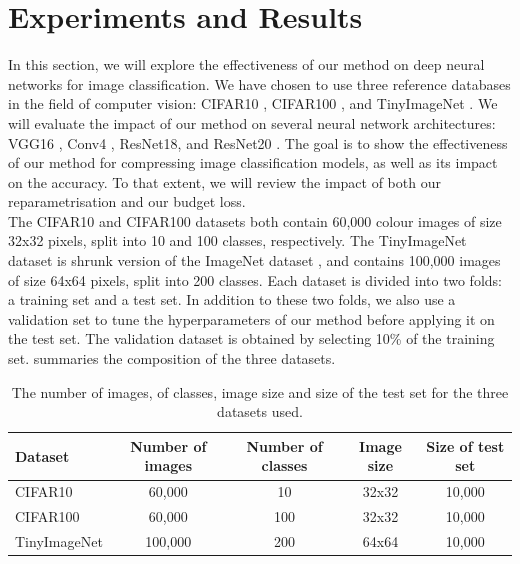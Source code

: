 
\section{Experiments and Results}
\label{sec:chap1:experiments}
In this section, we will explore the effectiveness of our method on deep neural
networks for image classification. We have chosen to use three reference
databases in the field of computer vision: CIFAR10 \cite{CIFARdataset}, CIFAR100
\cite{CIFARdataset}, and TinyImageNet \cite{TinyImageNet}. We will evaluate the
impact of our method on several neural network architectures: VGG16
\cite{DBLP:journals/corr/SimonyanZ14a}, Conv4 \cite{DBLP:conf/iclr/FrankleC19},
ResNet18, and ResNet20 \cite{DBLP:conf/cvpr/HeZRS16}. The goal is to show the
effectiveness of our method for compressing image classification models, as well
as its impact on the accuracy. To that extent, we will review the impact of both
our reparametrisation and our budget loss.\\

The CIFAR10 and CIFAR100 datasets both contain 60,000 colour images of size
32x32 pixels, split into 10 and 100 classes, respectively. The TinyImageNet
dataset is shrunk version of the ImageNet dataset
\cite{DBLP:journals/ijcv/RussakovskyDSKS15}, and contains 100,000 images of size
64x64 pixels, split into 200 classes. Each dataset is divided into two folds: a
training set and a test set. In addition to these two folds, we also use a
validation set to tune the hyperparameters of our method before applying it on
the test set. The validation dataset is obtained by selecting 10\% of the
training set.  summaries the composition of the three
datasets.\\


\begin{table}[ht]
  \centering
  \begin{tabular}{lcccc}
    \toprule
    \textbf{Dataset} & \textbf{Number of images} & \textbf{Number of classes} &
    \textbf{Image size} & \textbf{Size of test set} \\ 
    \hline
    CIFAR10 & 60,000 & 10 & 32x32 & 10,000 \\ 
    CIFAR100 & 60,000 & 100 & 32x32 & 10,000\\ 
    TinyImageNet & 100,000 & 200 & 64x64 &10,000 \\ 
    \bottomrule
  \end{tabular}
  \caption{The number of images, of classes, image size and size of the test set for the three datasets used.}
  \label{tab:chap1:datasets}
\end{table}

